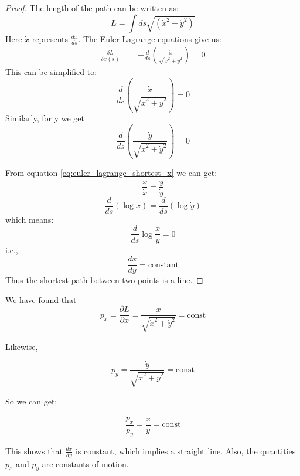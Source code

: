 \begin{proof}
    The length of the path can be written as:
    \begin{equation}
        L = \int ds \sqrt{\left(\dot{x}^2 + \dot{y}^2\right)}
    \end{equation}
    Here $\dot{x}$ represents $\frac{dx}{ds}$.
    The Euler-Lagrange equations give us:
    \begin{align}
        \frac{\delta L}{\delta x\left(s\right)} &= -\frac{d}{ds} 
        \left(\frac{\dot{x}}{\sqrt{\dot{x}^2 + \dot{y}^2}}\right) = 0
    \end{align}
    This can be simplified to:
    \begin{equation}
       \frac{d}{ds} \left(\frac{\dot{x}}{\sqrt{\dot{x}^2 + \dot{y}^2}}\right) = 0
       \label{eq:euler_lagrange_shortest_x}
    \end{equation}
    Similarly, for y we get
    \begin{equation}
       \frac{d}{ds} \left(\frac{\dot{y}}{\sqrt{\dot{x}^2 + \dot{y}^2}}\right) = 0
    \end{equation}

    From equation \eqref{eq:euler_lagrange_shortest_x} we can get:
    \begin{equation}
        \frac{\ddot{x}}{\dot{x}} = \frac{\ddot{y}}{\dot{y}}
    \end{equation}
    \begin{equation}
        \frac{d}{ds} \left(\log \dot{x}\right) = \frac{d}{ds} \left(\log \dot{y}\right)
    \end{equation}
    which means:
    \begin{equation}
        \frac{d}{ds} \log \frac{\dot{x}}{\dot{y}} = 0
    \end{equation}
    i.e.,
    \begin{equation}
        \frac{dx}{dy} = \text{constant}
    \end{equation}
    Thus the shortest path between two points is a line.
\end{proof}

We have found that
\begin{equation}
    p_x = \frac{\partial L}{\partial \dot{x}} = \frac{\dot{x}}{\sqrt{\dot{x}^2 + \dot{y}^2}} = \text{const}
\end{equation}

Likewise, 

\begin{equation}
    p_y = \frac{\dot{y}}{\sqrt{\dot{x}^2 + \dot{y}^2}} = \text{const}
\end{equation}

So we can get: 

\begin{equation}
    \frac{p_x}{p_y} = \frac{\dot{x}}{\dot{y}} = \text{const}
\end{equation}

This shows that $\frac{dx}{dy}$ is constant, which implies a straight line. Also, the 
quantities $p_x$ and $p_y$ are constants of motion.